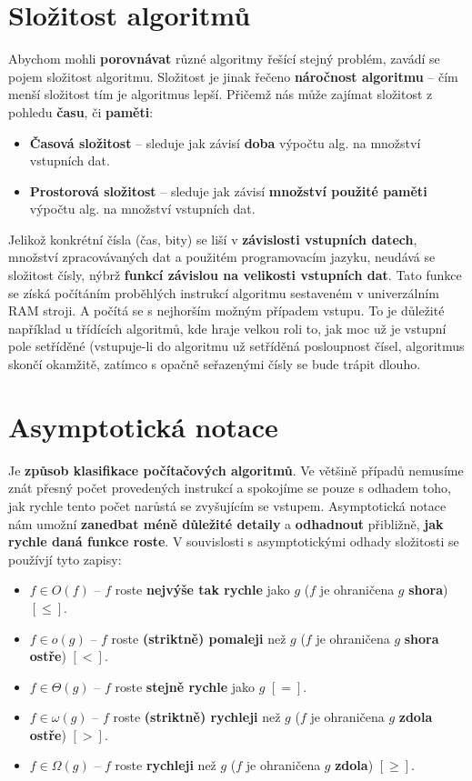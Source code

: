 \section{Složitost algoritmů}
Abychom mohli \textbf{porovnávat} různé algoritmy řešící stejný problém, zavádí se pojem složitost algoritmu. Složitost je jinak řečeno \textbf{náročnost algoritmu} -- čím menší složitost tím je algoritmus lepší.
Přičemž nás může zajímat složitost z pohledu \textbf{času}, či \textbf{paměti}:
\begin{itemize}
    \item \textbf{Časová složitost} -- sleduje jak závisí \textbf{doba} výpočtu alg. na množství vstupních dat.
    \item \textbf{Prostorová složitost} -- sleduje jak závisí \textbf{množství použité paměti} výpočtu alg. na množství vstupních dat.
\end{itemize}
Jelikož konkrétní čísla (čas, bity) se liší v \textbf{závislosti vstupních datech}, množství zpracovávaných dat a použitém programovacím jazyku, neudává se složitost čísly, nýbrž \textbf{funkcí závislou na velikosti vstupních dat}. Tato funkce se získá počítáním proběhlých instrukcí algoritmu sestaveném v univerzálním RAM stroji. A počítá se s nejhorším možným případem vstupu. To je důležité například u třídících algoritmů, kde hraje velkou roli to, jak moc už je vstupní pole setříděné (vstupuje-li do algoritmu už setříděná posloupnost čísel, algoritmus skončí okamžitě, zatímco s opačně seřazenými čísly se bude trápit dlouho.

\section{Asymptotická notace}
Je \textbf{způsob klasifikace počítačových algoritmů}. Ve většině případů nemusíme znát přesný počet provedených instrukcí a spokojíme se pouze s odhadem toho, jak rychle tento počet narůstá se zvyšujícím se vstupem. Asymptotická notace nám umožní \textbf{zanedbat méně důležité detaily} a \textbf{odhadnout} přibližně, \textbf{jak rychle daná funkce roste}.
V souvislosti s asymptotickými odhady složitosti se používjí tyto zapisy:
\begin{itemize}
    \item $f \in O(f)$ -- $f$ roste \textbf{nejvýše tak rychle} jako $g$ ($f$ je ohraničena $g$ \textbf{shora}) $[\leq]$.
    \item $f \in o(g)$ -- $f$ roste \textbf{(striktně) pomaleji} než $g$ ($f$ je ohraničena $g$ \textbf{shora ostře}) $[<]$.
    \item $f \in \Theta (g)$ -- $f$ roste \textbf{stejně rychle} jako $g$ $[=]$.
    \item $f \in \omega(g)$ -- $f$ roste \textbf{(striktně) rychleji} než $g$ ($f$ je ohraničena $g$ \textbf{zdola ostře}) $[>]$.
    \item $f \in \Omega(g)$ -- $f$ roste \textbf{rychleji} než $g$ ($f$ je ohraničena $g$ \textbf{zdola}) $[\geq]$.
\end{itemize}

